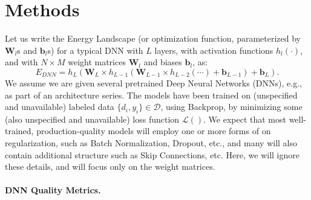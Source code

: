 \section{Methods}
\label{sxn:methods}


Let us write the Energy Landscape (or optimization function, parameterized by $\mathbf{W}_{l}$s and $\mathbf{b}_{l}$s) for a typical DNN with $L$ layers, with activation functions $h_{l}(\cdot)$, and with $N\times M$ weight matrices $\mathbf{W}_{l}$ and biases $\mathbf{b}_{l}$, as:
\begin{equation}
E_{DNN}=h_{L}(\mathbf{W}_{L}\times h_{L-1}(\mathbf{W}_{L-1}\times h_{L-2}(\cdots)+\mathbf{b}_{L-1})+\mathbf{b}_{L})  .
\label{eqn:dnn_energy}
\end{equation}
We assume we are given several pretrained Deep Neural Networks (DNNs), e.g., as part of an architecture series.
The models have been trained on (unspecified and unavailable) labeled data $\{d_{i},y_{i}\}\in\mathcal{D}$, using Backprop, by minimizing some (also unspecified and unavailable) loss function $\mathcal{L}()$. 
We expect that most well-trained, production-quality models will employ one or more forms of on regularization, such as Batch Normalization, Dropout, etc., and many will also contain additional structure such as Skip Connections, etc. 
Here, we will ignore these details, and will focus only on the weight matrices. 


\paragraph{DNN Quality Metrics.}

